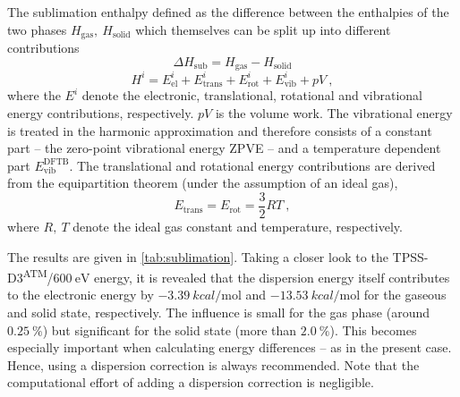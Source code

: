 \documentclass[a4paper,12pt, parskip=half]{scrartcl}
\begin{document}
The sublimation enthalpy defined as the difference between the enthalpies of the two phases $ H_\mathrm{gas},~H_\mathrm{solid} $ which themselves can be split up into different contributions
%
\begin{equation}
	\Delta H_\mathrm{sub} = H_\mathrm{gas} - H_\mathrm{solid}
\end{equation}
%
\begin{equation}
	H^i = E_\mathrm{el}^i + E_\mathrm{trans}^i + E_\mathrm{rot}^i + E_\mathrm{vib}^i + pV~,
\end{equation}
%
where the $ E^i $ denote the electronic, translational, rotational and vibrational energy contributions, respectively. $ pV $ is the volume work. The vibrational energy is treated in the harmonic approximation and therefore consists of a constant part -- the zero-point vibrational energy ZPVE -- and a temperature dependent part $ E_\mathrm{vib}^\mathrm{DFTB}$. The translational and rotational energy contributions are derived from the equipartition theorem (under the assumption of an ideal gas),
%
\begin{equation}
	E_\mathrm{trans} = E_\mathrm{rot} = \frac{3}{2}RT~,
\end{equation}
%
where $ R,~T $ denote the ideal gas constant and temperature, respectively.

The results are given in \autoref{tab:sublimation}. Taking a closer look to the TPSS-D3\textsuperscript{ATM}/$ \SI[]{600}{\electronvolt} $ energy, it is revealed that the dispersion energy itself contributes to the electronic energy by $ \SI{-3.39}{kcal\per\mole} $ and $ \SI[]{-13.53}{kcal\per\mole} $ for the gaseous and solid state, respectively. The influence is small for the gas phase (around $ \SI[]{0.25}{\percent} $) but significant for the solid state (more than $ \SI[]{2.0}{\percent} $). This becomes especially important when calculating energy differences -- as in the present case. Hence, using a dispersion correction is always recommended. Note that the computational effort of adding a dispersion correction is negligible.
\end{document}
